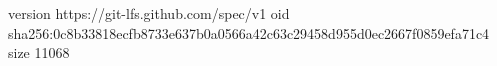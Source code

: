 version https://git-lfs.github.com/spec/v1
oid sha256:0c8b33818ecfb8733e637b0a0566a42c63c29458d955d0ec2667f0859efa71c4
size 11068

